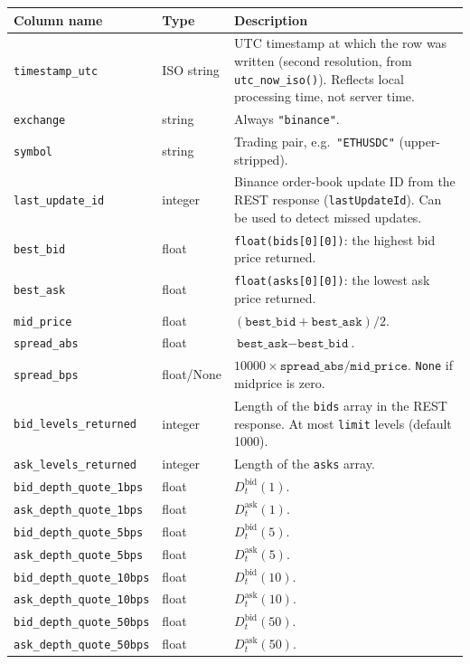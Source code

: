 \documentclass[11pt,a4paper]{article}
\begin{document}
\begin{xltabular}{\linewidth}{L{4.8cm}L{2.4cm}Y}
\toprule
\textbf{Column name} & \textbf{Type} & \textbf{Description} \\
\midrule
\texttt{timestamp\_utc} & ISO string &
  UTC timestamp at which the row was written (second resolution,
  from \texttt{utc\_now\_iso()}). Reflects local processing time,
  not server time. \\
\texttt{exchange} & string &
  Always \texttt{"binance"}. \\
\texttt{symbol} & string &
  Trading pair, e.g.\ \texttt{"ETHUSDC"} (upper-stripped). \\
\texttt{last\_update\_id} & integer &
  Binance order-book update ID from the REST response
  (\texttt{lastUpdateId}). Can be used to detect missed updates. \\
\texttt{best\_bid} & float &
  \texttt{float(bids[0][0])}: the highest bid price returned. \\
\texttt{best\_ask} & float &
  \texttt{float(asks[0][0])}: the lowest ask price returned. \\
\texttt{mid\_price} & float &
  $(\texttt{best\_bid} + \texttt{best\_ask}) / 2$. \\
\texttt{spread\_abs} & float &
  $\texttt{best\_ask} - \texttt{best\_bid}$. \\
\texttt{spread\_bps} & float/None &
  $10000 \times \texttt{spread\_abs} / \texttt{mid\_price}$.
  \texttt{None} if midprice is zero. \\
\texttt{bid\_levels\_returned} & integer &
  Length of the \texttt{bids} array in the REST response. At most
  \texttt{limit} levels (default 1000). \\
\texttt{ask\_levels\_returned} & integer &
  Length of the \texttt{asks} array. \\
\texttt{bid\_depth\_quote\_1bps} & float &
  $D_t^{\mathrm{bid}}(1)$. \\
\texttt{ask\_depth\_quote\_1bps} & float &
  $D_t^{\mathrm{ask}}(1)$. \\
\texttt{bid\_depth\_quote\_5bps} & float &
  $D_t^{\mathrm{bid}}(5)$. \\
\texttt{ask\_depth\_quote\_5bps} & float &
  $D_t^{\mathrm{ask}}(5)$. \\
\texttt{bid\_depth\_quote\_10bps} & float &
  $D_t^{\mathrm{bid}}(10)$. \\
\texttt{ask\_depth\_quote\_10bps} & float &
  $D_t^{\mathrm{ask}}(10)$. \\
\texttt{bid\_depth\_quote\_50bps} & float &
  $D_t^{\mathrm{bid}}(50)$. \\
\texttt{ask\_depth\_quote\_50bps} & float &
  $D_t^{\mathrm{ask}}(50)$. \\
\bottomrule
\end{xltabular}
\end{document}
